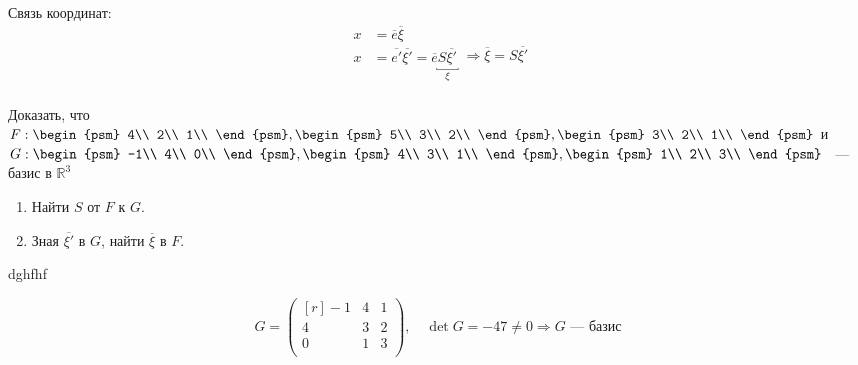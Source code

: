 Связь координат:
\begin{equation*}
\left.
\begin{aligned}
x&=\overline{e} \overline{\xi}\\
x&=\overline{e'}\overline{\xi'}=\overline{e}\underbracket{S\overline{\xi'}}_{\xi}\\
\end{aligned} 
\right. \Rightarrow \boxed{\overline{\xi} =S\overline{\xi'}}
\end{equation*}
\vspace{3mm}
\begin{prim}	
	Доказать, что $F:\begin{psm}
	4\\
	2\\
	1\\
	\end{psm},\begin{psm}
	5\\
	3\\
	2\\
	\end{psm},\begin{psm}
	3\\
	2\\
	1\\
	\end{psm}$ и $G:\begin{psm}
	-1\\
	4\\
	0\\
	\end{psm},\begin{psm}
	4\\
	3\\
	1\\
	\end{psm},\begin{psm}
	1\\
	2\\
	3\\
	\end{psm}$ ~---~ базис в $\mathbb{R}^3$
	\begin{enumerate}
		\item Найти $S$ от $F$ к $G$.
		\item Зная $\overline{\xi'}$ в $G$, найти $\overline{\xi}$ в $F$.
	\end{enumerate}
dghfhf
\end{prim}
$$G = \begin{pmatrix*}[r]
-1 & 4 & 1\\
4 & 3 & 2\\
0 & 1 & 3\\
\end{pmatrix*},\quad \det G =-47 \neq 0 \Rightarrow G \text{ --- базис}$$
